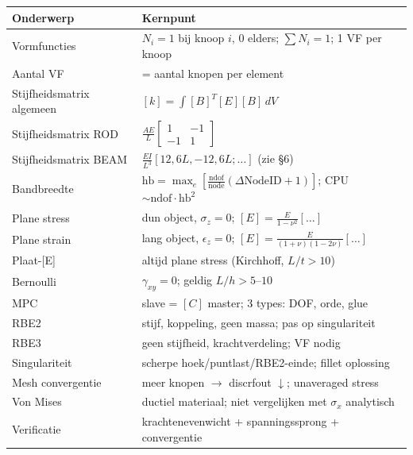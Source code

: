 \documentclass[a4paper,10pt]{article}
\begin{document}
\begin{center}
\renewcommand{\arraystretch}{1.4}
\begin{tabular}{p{5cm}p{9cm}}
\toprule
\textbf{Onderwerp} & \textbf{Kernpunt}\\
\midrule
Vormfuncties & $N_i=1$ bij knoop $i$, 0 elders; $\sum N_i=1$; 1 VF per knoop\\
Aantal VF & = aantal knopen per element\\
Stijfheidsmatrix algemeen & $[k] = \int [B]^T[E][B]\,dV$\\
Stijfheidsmatrix ROD & $\frac{AE}{L}\begin{bmatrix}1&-1\\-1&1\end{bmatrix}$\\
Stijfheidsmatrix BEAM & $\frac{EI}{L^3}[12,6L,-12,6L;\ldots]$ (zie \S6)\\
Bandbreedte & $\text{hb} = \max_e[\frac{\text{ndof}}{\text{node}}(\Delta\text{NodeID}+1)]$; CPU $\sim \text{ndof}\cdot\text{hb}^2$\\
Plane stress & dun object, $\sigma_z=0$; $[E] = \frac{E}{1-\nu^2}[\ldots]$\\
Plane strain & lang object, $\epsilon_z=0$; $[E] = \frac{E}{(1+\nu)(1-2\nu)}[\ldots]$\\
Plaat-[E] & altijd plane stress (Kirchhoff, $L/t>10$)\\
Bernoulli & $\gamma_{xy}=0$; geldig $L/h>5\text{--}10$\\
MPC & slave = $[C]$ master; 3 types: DOF, orde, glue\\
RBE2 & stijf, koppeling, geen massa; pas op singulariteit\\
RBE3 & geen stijfheid, krachtverdeling; VF nodig\\
Singulariteit & scherpe hoek/puntlast/RBE2-einde; fillet oplossing\\
Mesh convergentie & meer knopen $\to$ discrfout $\downarrow$; unaveraged stress\\
Von Mises & ductiel materiaal; niet vergelijken met $\sigma_x$ analytisch\\
Verificatie & krachtenevenwicht + spanningssprong + convergentie\\
\bottomrule
\end{tabular}
\end{center}
\end{document}
